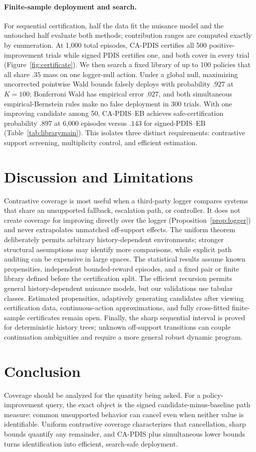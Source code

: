 \paragraph{Finite-sample deployment and search.}
For sequential certification, half the data fit the nuisance model and the untouched half evaluate both methods; contribution ranges are computed exactly by enumeration. At 1,000 total episodes, CA-PDIS certifies all 500 positive-improvement trials while signed PDIS certifies one, and both cover in every trial (Figure~\ref{fig:certificate}). We then search a fixed library of up to 100 policies that all share $.35$ mass on one logger-null action. Under a global null, maximizing uncorrected pointwise Wald bounds falsely deploys with probability $.927$ at $K=100$; Bonferroni Wald has empirical error $.027$, and both simultaneous empirical-Bernstein rules make no false deployment in 300 trials. With one improving candidate among 50, CA-PDIS--EB achieves safe-certification probability $.897$ at 6,000 episodes versus $.143$ for signed-PDIS--EB (Table~\ref{tab:librarymain}). This isolates three distinct requirements: contrastive support screening, multiplicity control, and efficient estimation.

\section{Discussion and Limitations}

Contrastive coverage is most useful when a third-party logger compares systems that share an unsupported fallback, escalation path, or controller. It does not create coverage for improving directly over the logger (Proposition~\ref{prop:logger}) and never extrapolates unmatched off-support effects. The uniform theorem deliberately permits arbitrary history-dependent environments; stronger structural assumptions may identify more comparisons, while explicit path auditing can be expensive in large spaces. The statistical results assume known propensities, independent bounded-reward episodes, and a fixed pair or finite library defined before the certification split. The efficient recursion permits general history-dependent nuisance models, but our validations use tabular classes. Estimated propensities, adaptively generating candidates after viewing certification data, continuous-action approximations, and fully cross-fitted finite-sample certificates remain open. Finally, the sharp sequential interval is proved for deterministic history trees; unknown off-support transitions can couple continuation ambiguities and require a more general robust dynamic program.

\section{Conclusion}

Coverage should be analyzed for the quantity being asked. For a policy-improvement query, the exact object is the signed candidate-minus-baseline path measure: common unsupported behavior can cancel even when neither value is identifiable. Uniform contrastive coverage characterizes that cancellation, sharp bounds quantify any remainder, and CA-PDIS plus simultaneous lower bounds turns identification into efficient, search-safe deployment.
